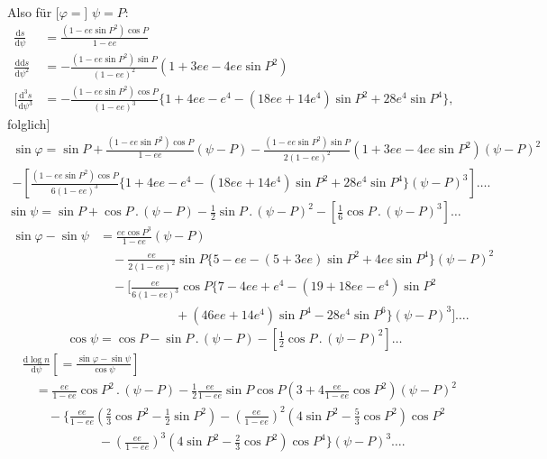\par\clearpage
\noindent{}\makebox[12mm][r]{}\par\medskip

\noindent Also für [\(\varphi=\)] \(\psi=P\):
\[
\begin{aligned}
\frac{\mathrm ds}{\mathrm d\psi}
&=\frac{(1-ee\sin P^2)\cos P}{1-ee}\\
\frac{\mathrm{dd}s}{\mathrm d\psi^2}
&=-\frac{(1-ee\sin P^2)\sin P}{(1-ee)^2}(1+3ee-4ee\sin P^2)\\
\mathopen{\Big[}\frac{\mathrm d^3s}{\mathrm d\psi^3}
&=-\frac{(1-ee\sin P^2)\cos P}{(1-ee)^3}
\{1+4ee-e^4-(18ee+14e^4)\sin P^2+28e^4\sin P^4\},
\end{aligned}
\]
\noindent folglich]
\[
\begin{gathered}
\sin\varphi=\sin P+\frac{(1-ee\sin P^2)\cos P}{1-ee}(\psi-P)
-\frac{(1-ee\sin P^2)\sin P}{2(1-ee)^2}(1+3ee-4ee\sin P^2)(\psi-P)^2\\
-\left[\frac{(1-ee\sin P^2)\cos P}{6(1-ee)^3}
\{1+4ee-e^4-(18ee+14e^4)\sin P^2+28e^4\sin P^4\}(\psi-P)^3\right]\ldots.
\end{gathered}
\]
\noindent [Da]
\[
\sin\psi=\sin P+\cos P\,.\,(\psi-P)-\tfrac12\sin P\,.\,(\psi-P)^2
-[\tfrac16\cos P\,.\,(\psi-P)^3]\ldots
\]
\[
\begin{aligned}
\sin\varphi-\sin\psi&=\frac{ee\cos P^3}{1-ee}(\psi-P)\\
&\quad-\frac{ee}{2(1-ee)^2}\sin P\{5-ee-(5+3ee)\sin P^2+4ee\sin P^4\}(\psi-P)^2\\
&\quad-\Big[\frac{ee}{6(1-ee)^3}\cos P\{7-4ee+e^4-(19+18ee-e^4)\sin P^2\\
&\qquad\qquad\qquad+(46ee+14e^4)\sin P^4-28e^4\sin P^6\}(\psi-P)^3\Big]\ldots.
\end{aligned}
\]
\noindent [Mit]
\[
\cos\psi=\cos P-\sin P\,.\,(\psi-P)-[\tfrac12\cos P\,.\,(\psi-P)^2]\ldots
\]
\[
\begin{aligned}
&\frac{\mathrm d\log n}{\mathrm d\psi}
\left[=\frac{\sin\varphi-\sin\psi}{\cos\psi}\right]\\
&\quad=\frac{ee}{1-ee}\cos P^2\,.\,(\psi-P)
-\tfrac12\frac{ee}{1-ee}\sin P\cos P
\left(3+4\frac{ee}{1-ee}\cos P^2\right)(\psi-P)^2\\
&\qquad-\Big\{\frac{ee}{1-ee}(\tfrac23\cos P^2-\tfrac12\sin P^2)
-\left(\frac{ee}{1-ee}\right)^2(4\sin P^2-\tfrac53\cos P^2)\cos P^2\\
&\qquad\qquad\qquad-\left(\frac{ee}{1-ee}\right)^3
(4\sin P^2-\tfrac23\cos P^2)\cos P^4\Big\}(\psi-P)^3\ldots.
\end{aligned}
\]

